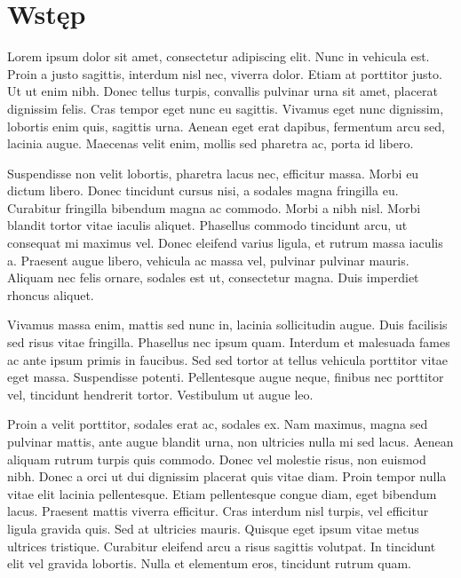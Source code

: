 \section*{Wstęp}

\setcounter{page}{1} %

Lorem ipsum dolor sit amet, consectetur adipiscing elit. Nunc in vehicula est. Proin a justo sagittis, interdum nisl nec, viverra dolor. Etiam at porttitor justo. Ut ut enim nibh. Donec tellus turpis, convallis pulvinar urna sit amet, placerat dignissim felis. Cras tempor eget nunc eu sagittis. Vivamus eget nunc dignissim, lobortis enim quis, sagittis urna. Aenean eget erat dapibus, fermentum arcu sed, lacinia augue. Maecenas velit enim, mollis sed pharetra ac, porta id libero.

Suspendisse non velit lobortis, pharetra lacus nec, efficitur massa. Morbi eu dictum libero. Donec tincidunt cursus nisi, a sodales magna fringilla eu. Curabitur fringilla bibendum magna ac commodo. Morbi a nibh nisl. Morbi blandit tortor vitae iaculis aliquet. Phasellus commodo tincidunt arcu, ut consequat mi maximus vel. Donec eleifend varius ligula, et rutrum massa iaculis a. Praesent augue libero, vehicula ac massa vel, pulvinar pulvinar mauris. Aliquam nec felis ornare, sodales est ut, consectetur magna. Duis imperdiet rhoncus aliquet.

Vivamus massa enim, mattis sed nunc in, lacinia sollicitudin augue. Duis facilisis sed risus vitae fringilla. Phasellus nec ipsum quam. Interdum et malesuada fames ac ante ipsum primis in faucibus. Sed sed tortor at tellus vehicula porttitor vitae eget massa. Suspendisse potenti. Pellentesque augue neque, finibus nec porttitor vel, tincidunt hendrerit tortor. Vestibulum ut augue leo.

Proin a velit porttitor, sodales erat ac, sodales ex. Nam maximus, magna sed pulvinar mattis, ante augue blandit urna, non ultricies nulla mi sed lacus. Aenean aliquam rutrum turpis quis commodo. Donec vel molestie risus, non euismod nibh. Donec a orci ut dui dignissim placerat quis vitae diam. Proin tempor nulla vitae elit lacinia pellentesque. Etiam pellentesque congue diam, eget bibendum lacus. Praesent mattis viverra efficitur. Cras interdum nisl turpis, vel efficitur ligula gravida quis. Sed at ultricies mauris. Quisque eget ipsum vitae metus ultrices tristique. Curabitur eleifend arcu a risus sagittis volutpat. In tincidunt elit vel gravida lobortis. Nulla et elementum eros, tincidunt rutrum quam.

